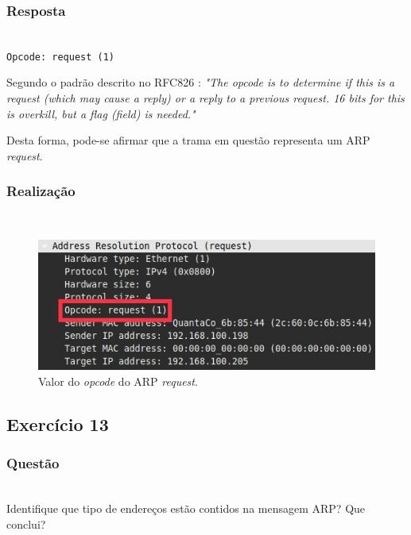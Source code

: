 \documentclass{llncs}
\begin{document}
\subsubsection{Resposta}\rule[-10pt]{0pt}{10pt}\\

\texttt{Opcode: request (1)}

Segundo o padrão descrito no RFC826 \cite{RFC0826}:
	\emph{"The opcode is to determine if this is a request (which may cause a reply) or a reply to a previous request.  16 bits for this is overkill, but a flag (field) is needed."}

Desta forma, pode-se afirmar que a trama em questão representa um ARP \textit{request}.

\subsubsection{Realização}\rule[-10pt]{0pt}{10pt}\\

\begin{figure}
  \begin{center}
	  \includegraphics[scale=0.6]{./imagens/arp_request_opcode.png} 
  \end{center}
	\caption{Valor do \textit{opcode} do ARP \textit{request}.}
  \label{fig:arp_request_opcode}
\end{figure} 


\clearpage
\subsection{Exercício 13}
\subsubsection{Questão}\rule[-10pt]{0pt}{10pt}\\

Identifique que tipo de endereços estão contidos na mensagem ARP? Que conclui?
\end{document}
